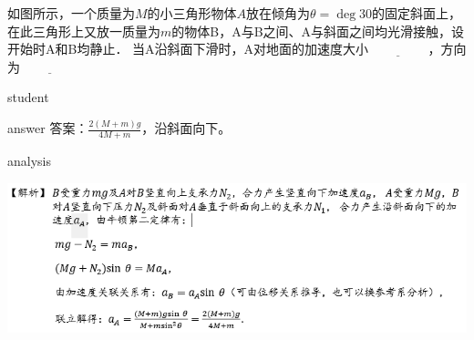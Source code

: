 \begin{example}
	如图所示，一个质量为$ M $的小三角形物体$ A $放在倾角为$ \theta = \deg{30} $的固定斜面上，在此三角形上又放一质量为$ m $的物体B，A与B之间、A与斜面之间均光滑接触，设开始时A和B均静止．
	当A沿斜面下滑时，A对地面的加速度大小 $\underline{ \qquad\qquad }$             ，方向为 $\underline{ \qquad\qquad }$                 
	
	\begin{taggedblock}{student}
		\vspace*{2cm}
	\end{taggedblock}
	
	
	\begin{taggedblock}{answer}
		答案：$ \frac{2(M+m)g}{4M+m} $，沿斜面向下。
	\end{taggedblock}
	
	
	\begin{taggedblock}{analysis}
			\begin{center}
				\includegraphics[width=0.9\linewidth]{image/newton-17}
			\end{center}
	\end{taggedblock}
\end{example}


